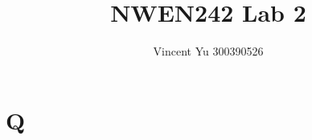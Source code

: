 \documentclass[]{article}
\title{NWEN242 Lab 2}
\author{Vincent Yu 300390526}
\begin{document}
\maketitle
\section*{Q}

\section{}
\end{document}
